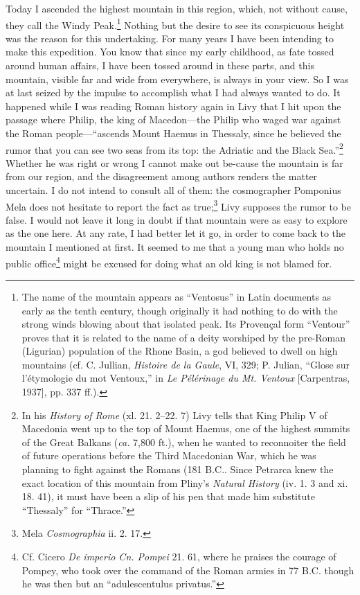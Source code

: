 \noindent Today I ascended the highest mountain in this region, which,
not without cause, they call the Windy Peak.\footnote{The name of the
mountain appears as ``Ventosus'' in Latin documents as early as the
tenth century, though originally it had nothing to do with the strong
winds blowing about that isolated peak. Its Proven\c{c}al form
``Ventour'' proves that it is related to the name of a deity worshiped
by the pre-Roman (Ligurian) population of the Rhone Basin, a god
believed to dwell on high mountains (cf. C. Jullian, \textit{Histoire
de la Gaule}, VI, 329; P. Julian, ``Glose sur l'\'{e}tymologie du mot
Ventoux,'' in \textit{Le P\'{e}l\'{e}rinage du Mt. Ventoux}
[Carpentras, 1937], pp. 337 ff.).} Nothing but the desire to see its
conspicuous height was the reason for this undertaking. For many years
I have been intending to make this expedition. You know that since my
early childhood, as fate tossed around human affairs, I have been
tossed around in these parts, and this mountain, visible far and wide
from everywhere, is always in your view. So I was at last seized by
the impulse to accomplish what I had always wanted to do. It happened
while I was reading Roman history again in Livy that I hit upon the
passage where Philip, the king of Macedon---the Philip who waged war
against the Roman people---``ascends Mount Haemus in Thessaly, since
he believed the rumor that you can see two seas from its top: the
Adriatic and the Black Sea.''\footnote{In his \textit{History of Rome}
(xl. 21. 2--22. 7) Livy tells that King Philip V of Macedonia went up
to the top of Mount Haemus, one of the highest summits of the Great
Balkans (\textit{ca.} 7,800 ft.), when he wanted to reconnoiter the
field of future operations before the Third Macedonian War, which he
was planning to fight against the Romans (181 \textsc{B.C.}. Since
Petrarca knew the exact location of this mountain from Pliny's
\textit{Natural History} (iv. 1. 3 and xi. 18. 41), it must have been
a slip of his pen that made him substitute ``Thessaly'' for
``Thrace.''} Whether he was right or wrong I cannot make out
be-cause the mountain is far from our region, and the
disagreement among authors renders the matter uncertain. I do not
intend to consult all of them: the cosmographer Pomponius Mela does
not hesitate to report the fact as true;\footnote{Mela
\textit{Cosmographia} ii. 2. 17.} Livy supposes the rumor to be false.
I would not leave it long in doubt if that mountain were as easy to
explore as the one here. At any rate, I had better let it go, in order
to come back to the mountain I mentioned at first. It seemed to me
that a young man who holds no public office\footnote{Cf. Cicero
\textit{De imperio Cn. Pompei} 21. 61, where he praises the courage of
Pompey, who took over the command of the Roman armies in 77
\textsc{B.C.} though he was then but an ``adulescentulus privatus.''}
might be excused for doing what an old king is not blamed for.

